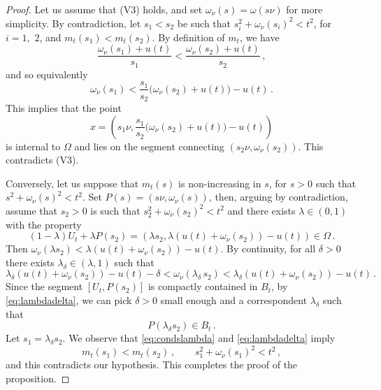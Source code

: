 \documentclass[a4paper,reqno,11pt]{amsart}
\begin{document}
\begin{proof}
Let us assume that (V3) holds, and set $\omega_{\nu}(s) = \omega(s\nu)$ for more simplicity. By contradiction, let $s_{1} < s_{2}$ be such that $s_{i}^{2} + \omega_{\nu}(s_i)^{2} < t^2$, for $i = 1,$ $2$, and $m_t(s_1) < m_t(s_2)$. By definition of $m_t$, we have
\begin{equation*}
\dfrac{\omega_{\nu}(s_1) + u(t)}{s_1} < \dfrac{\omega_{\nu}(s_2) + u(t)}{s_2} \, ,
\end{equation*}
and so equivalently
\begin{equation*}
\omega_{\nu}(s_1) < \dfrac{s_1}{s_2} \big(\omega_\nu(s_2) + u(t)\big) - u(t) \, .
\end{equation*}
This implies that the point
\begin{equation*}
x = \left(s_1 \nu , \dfrac{s_1}{s_2}\big(\omega_{\nu}(s_2) + u(t)\big) - u(t)\right)
\end{equation*}
is internal to $\Omega$ and lies on the segment connecting $(s_2 \nu , \omega_\nu(s_2))$. This contradicts (V3). 

Conversely, let us suppose that $m_t(s)$ is non-increasing in $s$, for $s > 0$ such that $s^2 + \omega_\nu(s)^2 < t^2$. Set $P(s) = (s \nu , \omega_\nu(s))$, then, arguing by contradiction, assume that $s_2 > 0$ is such that $s_2^2 + \omega_\nu(s_2)^2 < t^2$ and there exists $\lambda \in (0,1)$ with the property 
\begin{equation*}
(1 - \lambda) U_t + \lambda P(s_2) = (\lambda s_2 , \lambda (u(t) + \omega_\nu(s_{2})) - u(t)) \in \Omega \, .
\end{equation*}
Then $\omega_\nu(\lambda s_2) < \lambda (u(t) + \omega_\nu(s_2)) - u(t)$. By continuity, for all $\delta > 0$ there exists $\lambda_{\delta}\in (\lambda,1)$ such that
\begin{equation} \label{eq:lambdadelta}
\lambda_{\delta} (u(t) + \omega_\nu(s_2)) - u(t) - \delta < \omega_\nu(\lambda_{\delta} \, s_2) < \lambda_{\delta} (u(t) + \omega_\nu(s_2)) - u(t) \, .
\end{equation}
Since the segment $[U_t, P(s_2)]$ is compactly contained in $B_t$, by \eqref{eq:lambdadelta}, we can pick $\delta > 0$ small enough and a correspondent $\lambda_{\delta}$ such that
\begin{equation} \label{eq:condslambda}
P(\lambda_{\delta} s_2) \in B_t \, .
\end{equation}
Let $s_1 = \lambda_{\delta} s_2$. We observe that \eqref{eq:condslambda} and \eqref{eq:lambdadelta} imply
\begin{equation*}
m_t(s_1) < m_t(s_2) \, , \qquad s_1^2 + \omega_\nu(s_1)^2 < t^2 \, ,
\end{equation*}
and this contradicts our hypothesis. This completes the proof of the proposition.
\end{proof}
\end{document}
